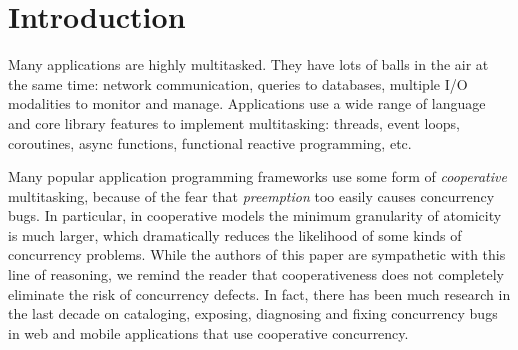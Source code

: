 \documentclass[acmsmall,anonymous,review]{acmart}\settopmatter{printfolios=true,printccs=false,printacmref=false}
\begin{document}



\maketitle




\section{Introduction}

Many applications are highly multitasked.
They have lots of balls in the air at the same time: network communication, queries to databases, multiple I/O modalities to monitor and manage.
Applications use a wide range of language and core library features to implement multitasking: threads, event loops, coroutines, async functions, functional reactive programming, etc.\footnotemark{}


Many popular application programming frameworks use some form of \emph{cooperative} multitasking, because of the fear that \emph{preemption} too easily causes concurrency bugs.
In particular, in cooperative models the minimum granularity of atomicity is much larger, which dramatically reduces the likelihood of some kinds of concurrency problems.
While the authors of this paper are sympathetic with this line of reasoning, we remind the reader that cooperativeness does not completely eliminate the risk of concurrency defects\footnotemark{}.
In fact, there has been much research in the last decade on cataloging, exposing, diagnosing and fixing concurrency bugs in web and mobile applications that use cooperative concurrency.
\end{document}
